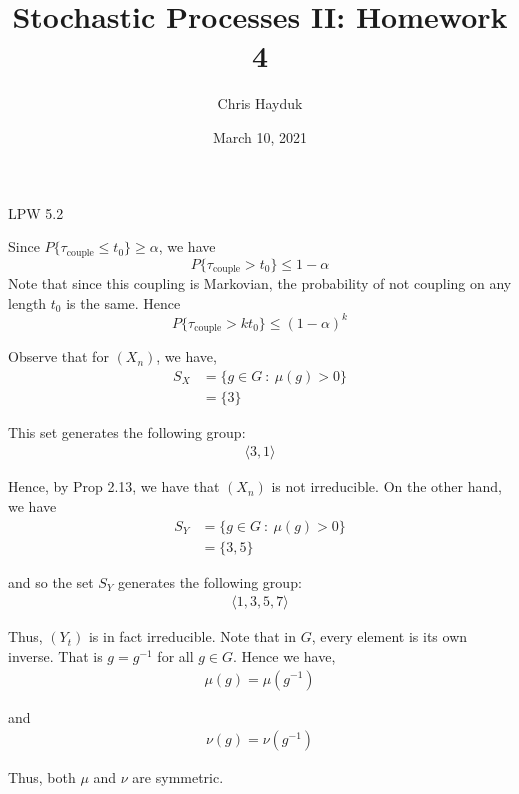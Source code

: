 \documentclass[12pt]{article}
\newenvironment{problem}[2][Problem]{\begin{trivlist}
\item[\hskip \labelsep {\bfseries #1}\hskip \labelsep {\bfseries #2.}]}{\end{trivlist}}
\begin{document}
\title{Stochastic Processes II: Homework 4}

\author{Chris Hayduk}
\date{March 10, 2021}

\maketitle

\begin{problem}{I}
LPW 5.2
\end{problem}

Since $P\{\tau_{\text{couple}} \leq t_0\} \geq \alpha$, we have $$P\{\tau_{\text{couple}} > t_0\} \leq 1 - \alpha$$ Note that since this coupling is Markovian, the probability of not coupling on any length $t_0$ is the same. Hence $$P\{\tau_{\text{couple}} > kt_0\} \leq (1 - \alpha)^k$$

\begin{problem}{II}
\end{problem}

Observe that for $(X_n)$, we have,
\begin{align*}
S_X &= \{g \in G \ : \ \mu(g) > 0 \}\\
&= \{3\}
\end{align*}

This set generates the following group:
\begin{align*}
\langle 3, 1 \rangle 
\end{align*}

Hence, by Prop 2.13, we have that $(X_n)$ is not irreducible. On the other hand, we have
\begin{align*}
S_Y &= \{g \in G \ : \ \mu(g) > 0 \}\\
&= \{3, 5\}
\end{align*}

and so the set $S_Y$ generates the following group:
\begin{align*}
\langle 1, 3, 5, 7 \rangle 
\end{align*}

Thus, $(Y_t)$ is in fact irreducible. Note that in $G$, every element is its own inverse. That is $g = g^{-1}$ for all $g \in G$. Hence we have, 
\begin{align*}
\mu(g) = \mu(g^{-1})
\end{align*}

and
\begin{align*}
\nu(g) = \nu(g^{-1})
\end{align*}

Thus, both $\mu$ and $\nu$ are symmetric.
\end{document}
